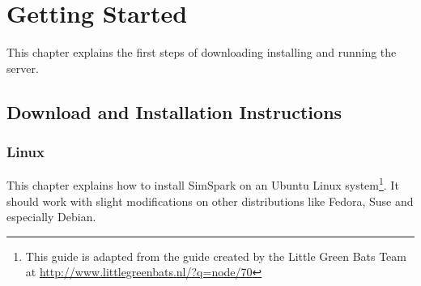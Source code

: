 
 \chapter{Getting Started}
\label{cha:getstarted}

This chapter explains the first steps of downloading installing and running the
server.

\section{Download and Installation Instructions}
\label{section:install}

\subsection{Linux}
\label{sec:linuxinstall}


This chapter explains how to install SimSpark on an Ubuntu Linux
system\footnote{This guide is adapted from the guide created by the
Little Green Bats Team at
\url{http://www.littlegreenbats.nl/?q=node/70}}. It should work with
slight modifications on other distributions like Fedora, Suse and
especially Debian.

